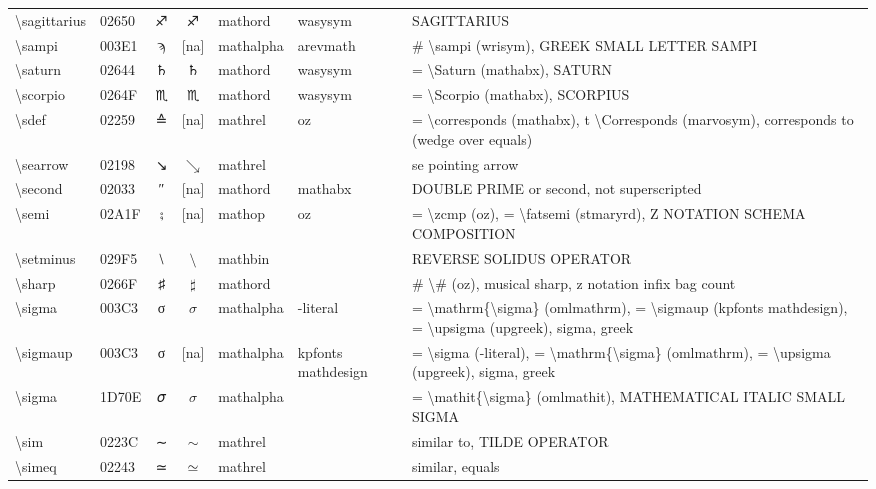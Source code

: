\documentclass[a4paper,landscape]{article}
\begin{document}
\begin{longtable}{llcclll}
\textbackslash{}sagittarius & 02650 & \textsf ♐ & $\sagittarius$ & mathord & wasysym & SAGITTARIUS \\
\textbackslash{}sampi & 003E1 & ϡ & [na] & mathalpha & arevmath & \# \textbackslash{}sampi (wrisym), GREEK SMALL LETTER SAMPI \\
\textbackslash{}saturn & 02644 & \textsf ♄ & $\saturn$ & mathord & wasysym & = \textbackslash{}Saturn (mathabx), SATURN \\
\textbackslash{}scorpio & 0264F & \textsf ♏ & $\scorpio$ & mathord & wasysym & = \textbackslash{}Scorpio (mathabx), SCORPIUS \\
\textbackslash{}sdef & 02259 & ≙ & [na] & mathrel & oz & = \textbackslash{}corresponds (mathabx),  t \textbackslash{}Corresponds (marvosym),  corresponds to (wedge over equals) \\
\textbackslash{}searrow & 02198 & ↘ & $\searrow$ & mathrel &  & se pointing arrow \\
\textbackslash{}second & 02033 & ″ & [na] & mathord & mathabx & DOUBLE PRIME or second, not superscripted \\
\textbackslash{}semi & 02A1F & ⨟ & [na] & mathop & oz & = \textbackslash{}zcmp (oz),  = \textbackslash{}fatsemi (stmaryrd),  Z NOTATION SCHEMA COMPOSITION \\
\textbackslash{}setminus & 029F5 & ⧵ & $\setminus$ & mathbin &  & REVERSE SOLIDUS OPERATOR \\
\textbackslash{}sharp & 0266F & ♯ & $\sharp$ & mathord &  & \# \textbackslash{}\# (oz), musical sharp, z notation infix bag count \\
\textbackslash{}sigma & 003C3 & σ & $\sigma$ & mathalpha & -literal & = \textbackslash{}mathrm\{\textbackslash{}sigma\} (omlmathrm), = \textbackslash{}sigmaup (kpfonts mathdesign), = \textbackslash{}upsigma (upgreek), sigma, greek \\
\textbackslash{}sigmaup & 003C3 & σ & [na] & mathalpha & kpfonts mathdesign & = \textbackslash{}sigma (-literal), = \textbackslash{}mathrm\{\textbackslash{}sigma\} (omlmathrm),  = \textbackslash{}upsigma (upgreek),  sigma,  greek \\
\textbackslash{}sigma & 1D70E & 𝜎 & $\sigma$ & mathalpha &  & = \textbackslash{}mathit\{\textbackslash{}sigma\} (omlmathit), MATHEMATICAL ITALIC SMALL SIGMA \\
\textbackslash{}sim & 0223C & ∼ & $\sim$ & mathrel &  & similar to, TILDE OPERATOR \\
\textbackslash{}simeq & 02243 & ≃ & $\simeq$ & mathrel &  & similar, equals \\

\end{longtable}
\end{document}
